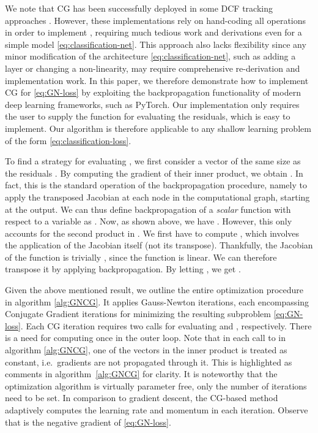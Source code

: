 \documentclass[10pt,twocolumn,letterpaper]{article}
\begin{document}
We note that CG has been successfully deployed in some DCF tracking approaches \cite{DanelljanCVPR2017,DanelljanECCV2016,DRT}. However, these implementations rely on hand-coding all operations in order to implement , requiring much tedious work and derivations even for a simple model \eqref{eq:classification-net}. This approach also lacks flexibility since any minor modification of the architecture \eqref{eq:classification-net}, such as adding a layer or changing a non-linearity, may require comprehensive re-derivation and implementation work. In this paper, we therefore demonstrate how to implement CG for \eqref{eq:GN-loss} by exploiting the backpropagation functionality of modern deep learning frameworks, such as PyTorch. Our implementation only requires the user to supply the function  for evaluating the residuals, which is easy to implement. Our algorithm is therefore applicable to any shallow learning problem of the form \eqref{eq:classification-loss}.

\newcommand{\bp}{\mathtt{BackProp}}


To find a strategy for evaluating , we first consider a vector  of the same size as the residuals . By computing the gradient of their inner product, we obtain . In fact, this is the standard operation of the backpropagation procedure, namely to apply the transposed Jacobian at each node in the computational graph, starting at the output. We can thus define backpropagation of a \emph{scalar} function  with respect to a variable  as . Now, as shown above, we have . However, this only accounts for the second product in . We first have to compute , which involves the application of the Jacobian itself (not its transpose). Thankfully, the Jacobian of the function  is trivially , since the function is linear. We can therefore transpose it by applying backpropagation. By letting , we get .

Given the above mentioned result, we outline the entire optimization procedure in algorithm \ref{alg:GNCG}. It applies  Gauss-Newton iterations, each encompassing  Conjugate Gradient iterations for minimizing the resulting subproblem \eqref{eq:GN-loss}. Each CG iteration requires two  calls for evaluating  and , respectively. There is a need for computing  once in the outer loop. Note that in each call to  in algorithm \ref{alg:GNCG}, one of the vectors in the inner product is treated as constant, i.e.\ gradients are not propagated through it. This is highlighted as comments in algorithm~\ref{alg:GNCG} for clarity. It is noteworthy that the optimization algorithm is virtually parameter free, only the number of iterations need to be set. In comparison to gradient descent, the CG-based method adaptively computes the learning rate  and momentum  in each iteration. Observe that  is the negative gradient of \eqref{eq:GN-loss}. 
\end{document}
